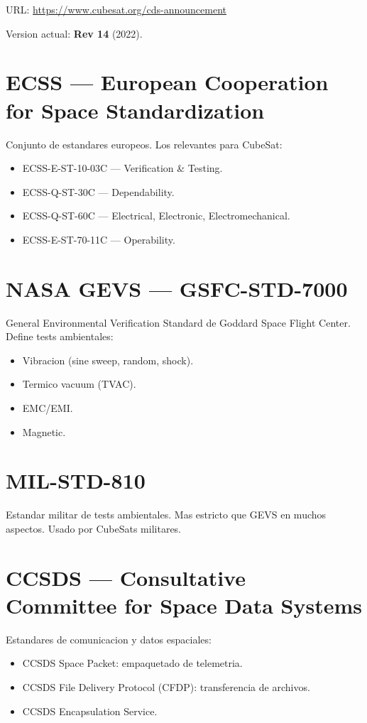 \documentclass[11pt,a4paper,oneside,openright]{book}
\begin{document}
URL: \url{https://www.cubesat.org/cds-announcement}

Version actual: \textbf{Rev 14} (2022).

\section{ECSS --- European Cooperation for Space Standardization}

Conjunto de estandares europeos. Los relevantes para CubeSat:
\begin{itemize}[leftmargin=2em]
  \item ECSS-E-ST-10-03C --- Verification \& Testing.
  \item ECSS-Q-ST-30C --- Dependability.
  \item ECSS-Q-ST-60C --- Electrical, Electronic, Electromechanical.
  \item ECSS-E-ST-70-11C --- Operability.
\end{itemize}

\section{NASA GEVS --- GSFC-STD-7000}

General Environmental Verification Standard de Goddard Space Flight
Center. Define tests ambientales:
\begin{itemize}[leftmargin=2em]
  \item Vibracion (sine sweep, random, shock).
  \item Termico vacuum (TVAC).
  \item EMC/EMI.
  \item Magnetic.
\end{itemize}

\section{MIL-STD-810}

Estandar militar de tests ambientales. Mas estricto que GEVS en muchos
aspectos. Usado por CubeSats militares.

\section{CCSDS --- Consultative Committee for Space Data Systems}

Estandares de comunicacion y datos espaciales:
\begin{itemize}[leftmargin=2em]
  \item CCSDS Space Packet: empaquetado de telemetria.
  \item CCSDS File Delivery Protocol (CFDP): transferencia de archivos.
  \item CCSDS Encapsulation Service.
\end{itemize}
\end{document}
